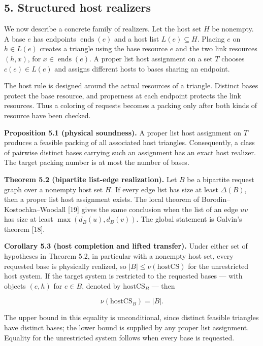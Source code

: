 \documentclass[english,11pt,a4paper]{article}
\newcounter{none}
\begin{document}
\subsection{5. Structured host
realizers}\label{structured-host-realizers}

We now describe a concrete family of realizers. Let the host set \(H\)
be nonempty. A base \(e\) has endpoints \(\operatorname{ends}(e)\) and a
host list \(L(e)\subseteq H\). Placing \(e\) on \(h\in L(e)\) creates a
triangle using the base resource \(e\) and the two link resources
\((h,x)\), for \(x\in\operatorname{ends}(e)\). A proper list host
assignment on a set \(T\) chooses \(c(e)\in L(e)\) and assigns different
hosts to bases sharing an endpoint.

The host rule is designed around the actual resources of a triangle.
Distinct bases protect the base resource, and properness at each
endpoint protects the link resources. Thus a coloring of requests
becomes a packing only after both kinds of resource have been checked.

\textbf{Proposition 5.1 (physical soundness).} A proper list host
assignment on \(T\) produces a feasible packing of all associated host
triangles. Consequently, a class of pairwise distinct bases carrying
such an assignment has an exact host realizer. The target packing number
is at most the number of bases.

\textbf{Theorem 5.2 (bipartite list-edge realization).} Let \(B\) be a
bipartite request graph over a nonempty host set \(H\). If every edge
list has size at least \(\Delta(B)\), then a proper list host assignment
exists. The local theorem of Borodin--Kostochka--Woodall {[}19{]} gives
the same conclusion when the list of an edge \(uv\) has size at least
\(\max(d_B(u),d_B(v))\). The global statement is Galvin's theorem
{[}18{]}.

\textbf{Corollary 5.3 (host completion and lifted transfer).} Under
either set of hypotheses in Theorem 5.2, in particular with a nonempty
host set, every requested base is physically realized, so
\(|B|\le\nu(\mathrm{hostCS})\) for the unrestricted host system. If the
target system is restricted to the requested bases --- with objects
\((e,h)\) for \(e\in B\), denoted by \(\mathrm{hostCS}_B\) --- then

\[
\nu(\mathrm{hostCS}_B)=|B|.
\]

The upper bound in this equality is unconditional, since distinct
feasible triangles have distinct bases; the lower bound is supplied by
any proper list assignment. Equality for the unrestricted system follows
when every base is requested.
\end{document}
